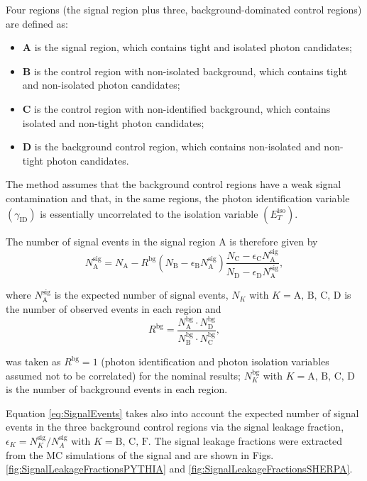 \documentclass[12pt, twoside]{article}
\numberwithin{equation}{section}
\numberwithin{figure}{section}
\begin{document}
Four regions (the signal region plus three, background-dominated control regions) are defined as:
\begin{itemize}
    \item \textbf{A} is the signal region, which contains tight and isolated photon candidates;
    \item \textbf{B} is the control region with non-isolated background, which contains tight and non-isolated photon candidates;
    \item \textbf{C} is the control region with non-identified background, which contains isolated and non-tight photon candidates;
    \item \textbf{D} is the background control region, which contains non-isolated and non-tight photon candidates.
\end{itemize}

The method assumes that the background control regions have a weak signal contamination and that, in the same regions, the photon identification variable $\left( \gamma_{\text{ID}} \right)$ is essentially uncorrelated to the isolation variable $\left( E^{\text{iso}}_{T} \right)$.

The number of signal events in the signal region A is therefore given by
\begin{equation}    \label{eq:SignalEvents}
    N^{\text{sig}}_{\text{A}} = N_{\text{A}} - R^{\text{bg}} \left( N_{\text{B}} - \epsilon_{\text{B}} N^{\text{sig}}_{\text{A}} \right) \frac{N_{\text{C}} - \epsilon_{\text{C}}N^{\text{sig}}_{\text{A}}}{N_{\text{D}} - \epsilon_{\text{D}}N^{\text{sig}}_{\text{A}}} ,
\end{equation}

where $N^{\text{sig}}_{\text{A}}$ is the expected number of signal events, $N_{K}$ with $K = \text{A, B, C, D}$ is the number of observed events in each region and
\begin{equation}    \label{eq:Rbg}
    R^{\text{bg}} = \frac{N^{\text{bg}}_{\text{A}} \cdot N^{\text{bg}}_{\text{D}}}{N^{\text{bg}}_{\text{B}} \cdot N^{\text{bg}}_{\text{C}}} ,
\end{equation}

was taken as $R^{\text{bg}} = 1$ (photon identification and photon isolation variables assumed not to be correlated) for the nominal results; $N^{\text{bg}}_{K}$ with $K = \text{A, B, C, D}$ is the number of background events in each region.

Equation \ref{eq:SignalEvents} takes also into account the expected number of signal events in the three background control regions via the signal leakage fraction, $\epsilon_{K} = N^{\text{sig}}_{K} / N^{\text{sig}}_{A}$ with $K = \text{B, C, F}$. The signal leakage fractions were extracted from the MC simulations of the signal and are shown in Figs.\,\ref{fig:SignalLeakageFractionsPYTHIA} and \ref{fig:SignalLeakageFractionsSHERPA}.
\end{document}

